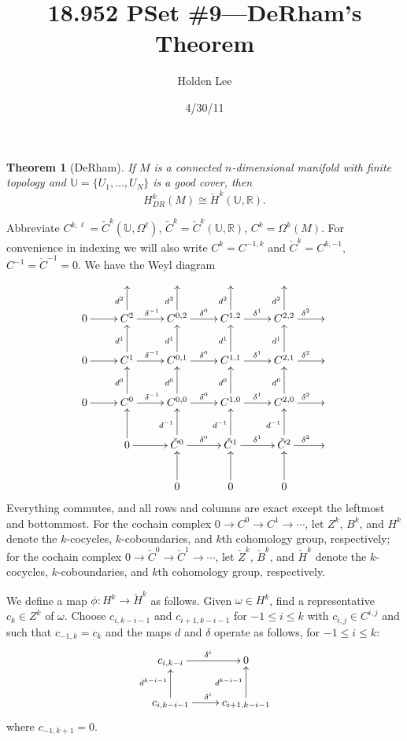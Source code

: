 \documentclass[12pt]{article}
\theoremstyle{norm}
\newtheorem{thm}{Theorem}
\newcommand{\R}[0]{\mathbb{R}}
\newcommand{\de}[0]{\delta}
\newcommand{\om}[0]{\omega}
\newcommand{\Om}[0]{\Omega}
\begin{document}
\title{18.952 PSet \#9---DeRham's Theorem}%
\author{Holden Lee}
\date{4/30/11}%
\maketitle
\thispagestyle{empty}
\begin{thm}[DeRham] If $M$ is a connected $n$-dimensional manifold with finite topology and $\mathbb U=\{U_1,\ldots, U_N\}$ is a good cover, then
\[
H^k_{DR}(M)\cong \check{H}^k(\mathbb U,\R).
\]
\end{thm}
Abbreviate $C^{k,\ell}=\check{C}^k(\mathbb U,\Om^{\ell})$,  
$\check{C}^k=\check{C}^k(\mathbb U,\R)$, $C^k=\Om^k(M)$. For convenience in indexing we will also write $C^k=C^{-1,k}$ and $\check C^k=C^{k,-1}$, $C^{-1}=\check C^{-1}=0$. We have the Weyl diagram
\[
\xymatrix{
&&&&&%
\\
0\ar[r] & C^2 \ar[u]^{d^2} \ar[r]^{\de^{-1}}& C^{0,2} \ar[u]^{d^2} \ar[r]^{\de^{0}}& C^{1,2} \ar[u]^{d^2} \ar[r]^{\de^{1}}& C^{2,2} \ar[u]^{d^2} \ar[r]^{\de^{2}}& %
\\
0\ar[r] & C^1 \ar[u]^{d^1} \ar[r]^{\de^{-1}}& C^{0,1} \ar[u]^{d^1} \ar[r]^{\de^{0}}& C^{1,1} \ar[u]^{d^1} \ar[r]^{\de^{1}}& C^{2,1} \ar[u]^{d^1} \ar[r]^{\de^{2}}&%
\\
0\ar[r] & C^0 \ar[u]^{d^0} \ar[r]^{\de^{-1}}& C^{0,0} \ar[u]^{d^0} \ar[r]^{\de^{0}}& C^{1,0} \ar[u]^{d^0} \ar[r]^{\de^{1}}& C^{2,0} \ar[u]^{d^0} \ar[r]^{\de^{2}}&%
\\
& 0 \ar[u] \ar[r]& \check C^{0} \ar[u]^{d^{-1}} \ar[r]^{\de^{0}}& \check C^{1} \ar[u]^{d^{-1}} \ar[r]^{\de^{1}}& \check C^{2} \ar[u]^{d^{-1}} \ar[r]^{\de^{2}}& %
\\
&& 0\ar[u]& 0\ar[u]& 0\ar[u]&%
\\
}
\]
Everything commutes, and all rows and columns are exact except the leftmost and bottommost. For the cochain complex $0\to C^0\to C^1\to\cdots$, let $Z^k$, $B^k$, and $H^k$ denote the $k$-cocycles, $k$-coboundaries, and $k$th cohomology group, respectively; for the cochain complex $0\to \check C^0\to \check C^1\to \cdots$, let $\check{Z}^k$, $\check B^k$, and $\check H^k$ denote the $k$-cocycles, $k$-coboundaries, and $k$th cohomology group, respectively.

We define a map $\phi:H^k\to \check H^k$ as follows. Given $\om\in H^k$, find a representative $c_k\in Z^k$ of $\om$. 
Choose $c_{i,k-i-1}$ and $c_{i+1,k-i-1}$ for $-1\le i\le k$ with $c_{i,j}\in C^{i,j}$ and such that $c_{-1,k}=c_k$ and 
the maps $d$ and $\de$ operate as follows, for $-1\le i\le k$:
\begin{equation}\label{commsq}
\xymatrix{
c_{i,k-i}\ar[r]^{\de^i} & 0\\
c_{i,k-i-1}\ar[u]^{d^{k-i-1}} \ar[r]^{\de^i} &c_{i+1,k-i-1}\ar[u]^{d^{k-i-1}}
}
\end{equation}
where $c_{-1,k+1}=0$.
\end{document}
